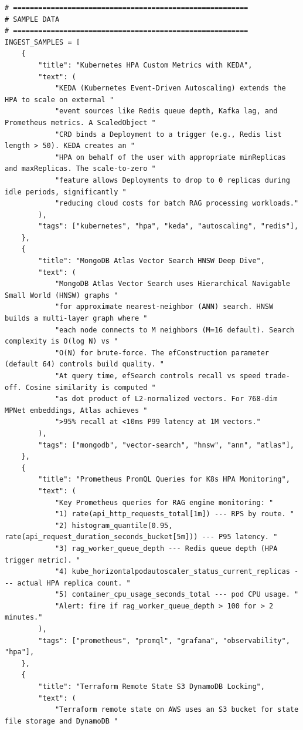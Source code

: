 \documentclass[12pt,a4paper]{report}
\begin{document}
\begin{lstlisting}
# ========================================================
# SAMPLE DATA
# ========================================================
INGEST_SAMPLES = [
    {
        "title": "Kubernetes HPA Custom Metrics with KEDA",
        "text": (
            "KEDA (Kubernetes Event-Driven Autoscaling) extends the HPA to scale on external "
            "event sources like Redis queue depth, Kafka lag, and Prometheus metrics. A ScaledObject "
            "CRD binds a Deployment to a trigger (e.g., Redis list length > 50). KEDA creates an "
            "HPA on behalf of the user with appropriate minReplicas and maxReplicas. The scale-to-zero "
            "feature allows Deployments to drop to 0 replicas during idle periods, significantly "
            "reducing cloud costs for batch RAG processing workloads."
        ),
        "tags": ["kubernetes", "hpa", "keda", "autoscaling", "redis"],
    },
    {
        "title": "MongoDB Atlas Vector Search HNSW Deep Dive",
        "text": (
            "MongoDB Atlas Vector Search uses Hierarchical Navigable Small World (HNSW) graphs "
            "for approximate nearest-neighbor (ANN) search. HNSW builds a multi-layer graph where "
            "each node connects to M neighbors (M=16 default). Search complexity is O(log N) vs "
            "O(N) for brute-force. The efConstruction parameter (default 64) controls build quality. "
            "At query time, efSearch controls recall vs speed trade-off. Cosine similarity is computed "
            "as dot product of L2-normalized vectors. For 768-dim MPNet embeddings, Atlas achieves "
            ">95% recall at <10ms P99 latency at 1M vectors."
        ),
        "tags": ["mongodb", "vector-search", "hnsw", "ann", "atlas"],
    },
    {
        "title": "Prometheus PromQL Queries for K8s HPA Monitoring",
        "text": (
            "Key Prometheus queries for RAG engine monitoring: "
            "1) rate(api_http_requests_total[1m]) --- RPS by route. "
            "2) histogram_quantile(0.95, rate(api_request_duration_seconds_bucket[5m])) --- P95 latency. "
            "3) rag_worker_queue_depth --- Redis queue depth (HPA trigger metric). "
            "4) kube_horizontalpodautoscaler_status_current_replicas --- actual HPA replica count. "
            "5) container_cpu_usage_seconds_total --- pod CPU usage. "
            "Alert: fire if rag_worker_queue_depth > 100 for > 2 minutes."
        ),
        "tags": ["prometheus", "promql", "grafana", "observability", "hpa"],
    },
    {
        "title": "Terraform Remote State S3 DynamoDB Locking",
        "text": (
            "Terraform remote state on AWS uses an S3 bucket for state file storage and DynamoDB "

\end{lstlisting}
\end{document}
